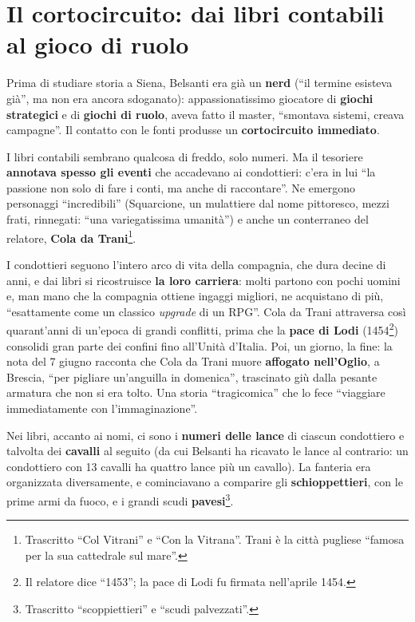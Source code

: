 \section{Il cortocircuito: dai libri contabili al gioco di ruolo}
\label{sec:c1-2-cortocircuito}

Prima di studiare storia a Siena, Belsanti era già un \textbf{nerd} (``il
termine esisteva già'', ma non era ancora sdoganato): appassionatissimo
giocatore di \textbf{giochi strategici} e di \textbf{giochi di ruolo}, aveva
fatto il master, ``smontava sistemi, creava campagne''. Il contatto con le
fonti produsse un \textbf{cortocircuito immediato}.

I libri contabili sembrano qualcosa di freddo, solo numeri. Ma il tesoriere
\textbf{annotava spesso gli eventi} che accadevano ai condottieri: c'era in lui
``la passione non solo di fare i conti, ma anche di raccontare''. Ne emergono
personaggi ``incredibili'' (Squarcione, un mulattiere dal nome pittoresco, mezzi
frati, rinnegati: ``una variegatissima umanità'') e anche un conterraneo del
relatore, \textbf{Cola da Trani}\footnote{Trascritto ``Col Vitrani'' e ``Con la
Vitrana''. Trani è la città pugliese ``famosa per la sua cattedrale sul
mare''.}.

I condottieri seguono l'intero arco di vita della compagnia, che dura decine di
anni, e dai libri si ricostruisce \textbf{la loro carriera}: molti partono con
pochi uomini e, man mano che la compagnia ottiene ingaggi migliori, ne
acquistano di più, ``esattamente come un classico \emph{upgrade} di un RPG''.
Cola da Trani attraversa così quarant'anni di un'epoca di grandi conflitti,
prima che la \textbf{pace di Lodi} (1454\footnote{Il relatore dice ``1453'';
la pace di Lodi fu firmata nell'aprile 1454.}) consolidi gran parte dei confini
fino all'Unità d'Italia. Poi, un giorno, la fine: la nota del 7 giugno racconta
che Cola da Trani muore \textbf{affogato nell'Oglio}, a Brescia, ``per pigliare
un'anguilla in domenica'', trascinato giù dalla pesante armatura che non si era
tolto. Una storia ``tragicomica'' che lo fece ``viaggiare immediatamente con
l'immaginazione''.

Nei libri, accanto ai nomi, ci sono i \textbf{numeri delle lance} di ciascun
condottiero e talvolta dei \textbf{cavalli} al seguito (da cui Belsanti ha
ricavato le lance al contrario: un condottiero con 13 cavalli ha quattro lance
più un cavallo). La fanteria era organizzata diversamente, e cominciavano a
comparire gli \textbf{schioppettieri}, con le prime armi da fuoco, e i grandi
scudi \textbf{pavesi}\footnote{Trascritto ``scoppiettieri'' e ``scudi
palvezzati''.}.

